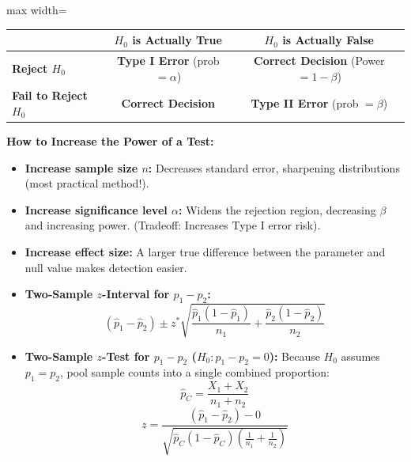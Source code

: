 \begin{lessonbox}
\begin{center}
\begin{adjustbox}{max width=\linewidth}
\begin{tabular}{|l|c|c|}
\hline
& \textbf{$H_0$ is Actually True} & \textbf{$H_0$ is Actually False} \\
\hline
\textbf{Reject $H_0$} & \textbf{Type I Error} (prob $= \alpha$) & \textbf{Correct Decision} (Power $= 1 - \beta$) \\
\hline
\textbf{Fail to Reject $H_0$} & \textbf{Correct Decision} & \textbf{Type II Error} (prob $= \beta$) \\
\hline
\end{tabular}
\end{adjustbox}
\end{center}
\textbf{How to Increase the Power of a Test:}
\begin{itemize}[leftmargin=1.2em]
  \item \textbf{Increase sample size $n$:} Decreases standard error, sharpening distributions (most practical method!).
  \item \textbf{Increase significance level $\alpha$:} Widens the rejection region, decreasing $\beta$ and increasing power. (Tradeoff: Increases Type I error risk).
  \item \textbf{Increase effect size:} A larger true difference between the parameter and null value makes detection easier.
\end{itemize}
\end{lessonbox}

\begin{lessonbox}
\begin{itemize}[leftmargin=1.2em]
  \item \textbf{Two-Sample $z$-Interval for $p_1 - p_2$:}
  \begin{equation}
    (\hat{p}_1 - \hat{p}_2) \pm z^* \sqrt{\frac{\hat{p}_1(1-\hat{p}_1)}{n_1} + \frac{\hat{p}_2(1-\hat{p}_2)}{n_2}}
  \end{equation}
  \item \textbf{Two-Sample $z$-Test for $p_1 - p_2$ ($H_0: p_1 - p_2 = 0$):}
  Because $H_0$ assumes $p_1 = p_2$, pool sample counts into a single combined proportion:
  \begin{equation}
    \hat{p}_C = \frac{X_1 + X_2}{n_1 + n_2}
  \end{equation}
  \begin{equation}
    z = \frac{(\hat{p}_1 - \hat{p}_2) - 0}{\sqrt{\hat{p}_C(1-\hat{p}_C)\left(\frac{1}{n_1} + \frac{1}{n_2}\right)}}
  \end{equation}
\end{itemize}
\end{lessonbox}

